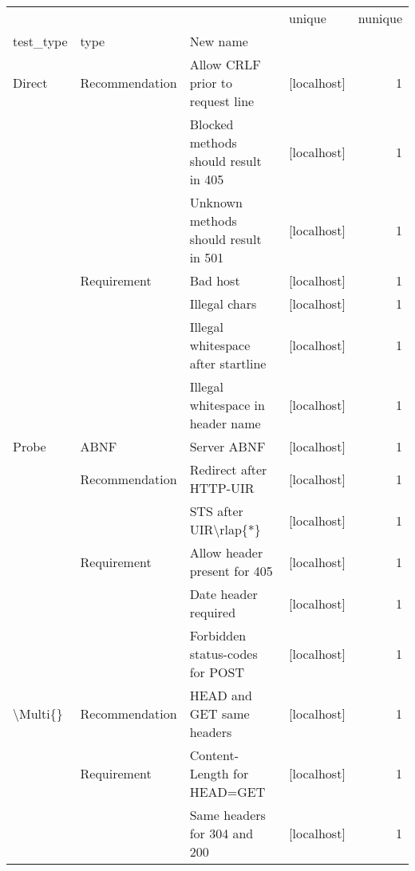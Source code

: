 \begin{tabular}{llllr}
\toprule
         &             &                              &       unique &  nunique \\
test\_type & type & New name &              &          \\
\midrule
Direct & Recommendation & Allow CRLF prior to request line &  [localhost] &        1 \\
         &             & Blocked methods should result in 405 &  [localhost] &        1 \\
         &             & Unknown methods should result in 501 &  [localhost] &        1 \\
         & Requirement & Bad host &  [localhost] &        1 \\
         &             & Illegal chars &  [localhost] &        1 \\
         &             & Illegal whitespace after startline &  [localhost] &        1 \\
         &             & Illegal whitespace in header name &  [localhost] &        1 \\
Probe & ABNF & Server ABNF &  [localhost] &        1 \\
         & Recommendation & Redirect after HTTP-UIR &  [localhost] &        1 \\
         &             & STS after UIR\textbackslash rlap\{*\} &  [localhost] &        1 \\
         & Requirement & Allow header present for 405 &  [localhost] &        1 \\
         &             & Date header required &  [localhost] &        1 \\
         &             & Forbidden status-codes for POST &  [localhost] &        1 \\
\textbackslash Multi\{\} & Recommendation & HEAD and GET same headers &  [localhost] &        1 \\
         & Requirement & Content-Length for HEAD=GET &  [localhost] &        1 \\
         &             & Same headers for 304 and 200 &  [localhost] &        1 \\
\bottomrule
\end{tabular}
